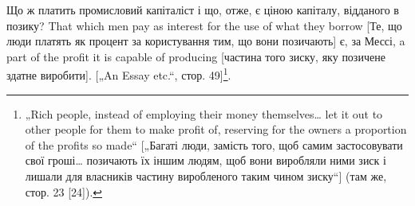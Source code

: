 Що ж платить промисловий капіталіст і що, отже, є ціною
капіталу, відданого в позику? That which men pay as interest for
the use of what they borrow [Те, що люди платять як процент за
користування тим, що вони позичають] є, за Мессі, a part of the
profit it is capable of producing [частина того зиску, яку позичене
здатне виробити]. [„An Essay etc.“, стор. 49]\footnote{
„Rich people, instead of employing their money themselves\dots{} let it out to
other people for them to make profit of, reserving for the owners a proportion of
the profits so made“ [„Багаті люди, замість того, щоб самим застосовувати свої
гроші\dots{} позичають їх іншим людям, щоб вони виробляли ними зиск і лишали для
власників частину виробленого таким чином зиску“] (там же, стор. 23 [24]).
}.
